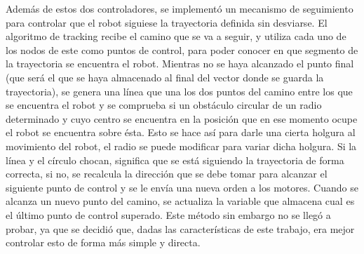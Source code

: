 Además de estos dos controladores, se implementó un mecanismo de seguimiento para controlar que el robot siguiese la trayectoria definida sin desviarse. El algoritmo de tracking recibe el camino que se va a seguir, y utiliza cada uno de los nodos de este como puntos de control, para poder conocer en que segmento de la trayectoria se encuentra el robot. Mientras no se haya alcanzado el punto final (que será el que se haya almacenado al final del vector donde se guarda la trayectoria), se genera una línea que una los dos puntos del camino entre los que se encuentra el robot y se comprueba si un obstáculo circular de un radio determinado y cuyo centro se encuentra en la posición que en ese momento ocupe el robot se encuentra sobre ésta. Esto se hace así para darle una cierta holgura al movimiento del robot, el radio se puede modificar para variar dicha holgura. Si la línea y el círculo chocan, significa que se está siguiendo la trayectoria de forma correcta, si no, se recalcula la dirección que se debe tomar para alcanzar el siguiente punto de control y se le envía una nueva orden a los motores. Cuando se alcanza un nuevo punto del camino, se actualiza la variable que almacena cual es el último punto de control superado. Este método sin embargo no se llegó a probar, ya que se decidió que, dadas las características de este trabajo, era mejor controlar esto de forma más simple y directa.  